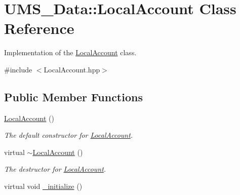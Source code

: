 \hypertarget{classUMS__Data_1_1LocalAccount}{
\section{UMS\_\-Data::LocalAccount Class Reference}
\label{classUMS__Data_1_1LocalAccount}
}


Implementation of the \hyperlink{classUMS__Data_1_1LocalAccount}{LocalAccount} class.  




{\ttfamily \#include $<$LocalAccount.hpp$>$}

\subsection*{Public Member Functions}
\begin{DoxyCompactItemize}
\item 
\hypertarget{classUMS__Data_1_1LocalAccount_a6cc4669b15c11e5b5f30563549334629}{
\hyperlink{classUMS__Data_1_1LocalAccount_a6cc4669b15c11e5b5f30563549334629}{LocalAccount} ()}
\label{classUMS__Data_1_1LocalAccount_a6cc4669b15c11e5b5f30563549334629}

\begin{DoxyCompactList}\small\item\em The default constructor for \hyperlink{classUMS__Data_1_1LocalAccount}{LocalAccount}. \item\end{DoxyCompactList}\item 
\hypertarget{classUMS__Data_1_1LocalAccount_a4c3a1191f0142ab235bf17fbbe493156}{
virtual \hyperlink{classUMS__Data_1_1LocalAccount_a4c3a1191f0142ab235bf17fbbe493156}{$\sim$LocalAccount} ()}
\label{classUMS__Data_1_1LocalAccount_a4c3a1191f0142ab235bf17fbbe493156}

\begin{DoxyCompactList}\small\item\em The destructor for \hyperlink{classUMS__Data_1_1LocalAccount}{LocalAccount}. \item\end{DoxyCompactList}\item 
\hypertarget{classUMS__Data_1_1LocalAccount_a7379cd54135551be9b963ef12974a221}{
virtual void \hyperlink{classUMS__Data_1_1LocalAccount_a7379cd54135551be9b963ef12974a221}{\_\-initialize} ()}
\label{classUMS__Data_1_1LocalAccount_a7379cd54135551be9b963ef12974a221}


\end{DoxyCompactItemize}
